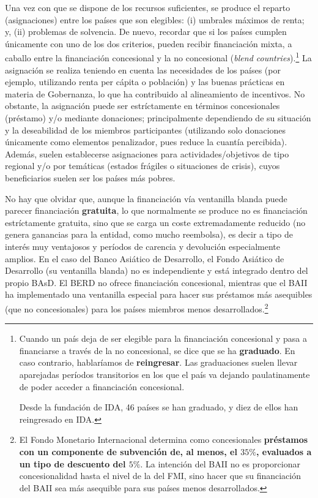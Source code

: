 \documentclass[10pt,a4paper]{article}
\begin{document}
Una vez con que se dispone de los recursos suficientes, se produce el reparto (asignaciones) entre los países que son elegibles: (i) umbrales máximos de renta; y, (ii) problemas de solvencia. De nuevo, recordar que si los países cumplen únicamente con uno de los dos criterios, pueden recibir financiación mixta, a caballo entre la financiación concesional y la no concesional (\textit{blend countries}).\footnote{%
    Cuando un país deja de ser elegible para la financiación concesional y pasa a financiarse a través de la no concesional, se dice que se ha \textbf{graduado}. En caso contrario, hablaríamos de \textbf{reingresar}. Las graduaciones suelen llevar aparejadas períodos transitorios en los que el país va dejando paulatinamente de poder acceder a financiación concesional. 

Desde la fundación de IDA, 46 países se han graduado, y diez de ellos han reingresado en IDA.
}  La asignación se realiza teniendo en cuenta las necesidades de los países (por ejemplo, utilizando renta per cápita o población) y las buenas prácticas en materia de Gobernanza, lo que ha contribuido al alineamiento de incentivos. No obstante, la asignación puede ser estríctamente en términos concesionales (préstamo) y/o mediante donaciones; principalmente dependiendo de su situación y la deseabilidad de los miembros participantes (utilizando solo donaciones únicamente como elementos penalizador, pues reduce la cuantía percibida). Además, suelen establecerse asignaciones para actividades/objetivos de tipo regional y/o por temáticas (estados frágiles o situaciones de crisis), cuyos beneficiarios suelen ser los países más pobres. 

No hay que olvidar que, aunque la financiación vía ventanilla blanda puede parecer financiación \textbf{gratuita}, lo que normalmente se produce no es financiación estríctamente gratuita, sino que se carga un coste extremadamente reducido (no genera ganancias para la entidad, como mucho reembolsa), es decir a tipo de interés muy ventajosos y períodos de carencia y devolución especialmente amplios. En el caso del Banco Asiático de Desarrollo, el Fondo Asiático de Desarrollo (su ventanilla blanda) no es independiente y está integrado dentro del propio BAsD. El BERD no ofrece financiación concesional, mientras que el BAII ha implementado una ventanilla especial para hacer sus préstamos más asequibles (que no concesionales) para los países miembros menos desarrollados.\footnote{%
    El Fondo Monetario Internacional determina como concesionales \textbf{préstamos con un componente de subvención de, al menos, el $35\%$, evaluados a un tipo de descuento del $5\%$}. La intención del BAII no es proporcionar concesionalidad hasta el nivel de la del FMI, sino hacer que su financiación del BAII sea más asequible para sus países menos desarrollados.
}
\end{document}
